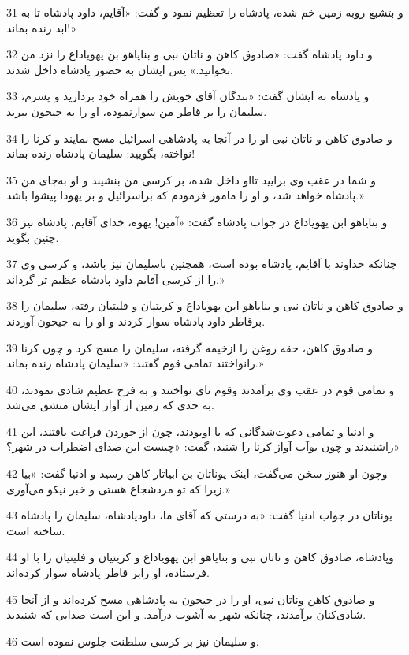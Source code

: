\par 31 و بتشبع روبه زمین خم شده، پادشاه را تعظیم نمود و گفت: «آقایم، داود پادشاه تا به ابد زنده بماند!»
\par 32 و داود پادشاه گفت: «صادوق کاهن و ناتان نبی و بنایاهو بن یهویاداع را نزد من بخوانید.» پس ایشان به حضور پادشاه داخل شدند.
\par 33 و پادشاه به ایشان گفت: «بندگان آقای خویش را همراه خود بردارید و پسرم، سلیمان را بر قاطر من سوارنموده، او را به جیحون ببرید.
\par 34 و صادوق کاهن و ناتان نبی او را در آنجا به پادشاهی اسرائیل مسح نمایند و کرنا را نواخته، بگویید: سلیمان پادشاه زنده بماند!
\par 35 و شما در عقب وی برایید تااو داخل شده، بر کرسی من بنشیند و او به‌جای من پادشاه خواهد شد، و او را مامور فرمودم که براسرائیل و بر یهودا پیشوا باشد.»
\par 36 و بنایاهو ابن یهویاداع در جواب پادشاه گفت: «آمین! یهوه، خدای آقایم، پادشاه نیز چنین بگوید.
\par 37 چنانکه خداوند با آقایم، پادشاه بوده است، همچنین باسلیمان نیز باشد، و کرسی وی را از کرسی آقایم داود پادشاه عظیم تر گرداند.»
\par 38 و صادوق کاهن و ناتان نبی و بنایاهو ابن یهویاداع و کریتیان و فلیتیان رفته، سلیمان را برقاطر داود پادشاه سوار کردند و او را به جیحون آوردند.
\par 39 و صادوق کاهن، حقه روغن را ازخیمه گرفته، سلیمان را مسح کرد و چون کرنا رانواختند تمامی قوم گفتند: «سلیمان پادشاه زنده بماند.»
\par 40 و تمامی قوم در عقب وی برآمدند وقوم نای نواختند و به فرح عظیم شادی نمودند، به حدی که زمین از آواز ایشان منشق می‌شد.
\par 41 و ادنیا و تمامی دعوت‌شدگانی که با اوبودند، چون از خوردن فراغت یافتند، این راشنیدند و چون یوآب آواز کرنا را شنید، گفت: «چیست این صدای اضطراب در شهر؟»
\par 42 وچون او هنوز سخن می‌گفت، اینک یوناتان بن ابیاتار کاهن رسید و ادنیا گفت: «بیا زیرا که تو مردشجاع هستی و خبر نیکو می‌آوری.»
\par 43 یوناتان در جواب ادنیا گفت: «به درستی که آقای ما، داودپادشاه، سلیمان را پادشاه ساخته است.
\par 44 وپادشاه، صادوق کاهن و ناتان نبی و بنایاهو ابن یهویاداع و کریتیان و فلیتیان را با او فرستاده، او رابر قاطر پادشاه سوار کرده‌اند.
\par 45 و صادوق کاهن وناتان نبی، او را در جیحون به پادشاهی مسح کرده‌اند و از آنجا شادی‌کنان برآمدند، چنانکه شهر به آشوب درآمد. و این است صدایی که شنیدید.
\par 46 و سلیمان نیز بر کرسی سلطنت جلوس نموده است.
